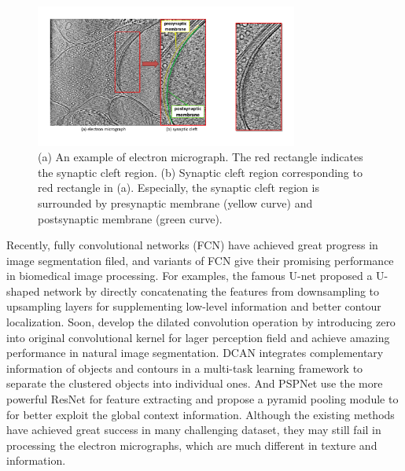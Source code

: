 \begin{figure}[t]
    \begin{center}
        \includegraphics[width=3.4in]{figs/FigImg.pdf}
   \end{center}
\caption{(a) An example of electron micrograph. The red rectangle indicates the synaptic cleft region. 
            (b) Synaptic cleft region corresponding to red rectangle in (a). Especially, the synaptic cleft region is surrounded by presynaptic membrane (yellow curve) and postsynaptic membrane (green curve). }
\label{fig:img}
\end{figure}
Recently, fully convolutional networks (FCN) \cite{Long2015,Ronneberger2015,Chen2016a,Chen2017,Zhao2016} have achieved great progress in image segmentation filed, and variants of FCN \cite{Ronneberger2015,Chen2017,Dhungel2015,Lieman-Sifry2017,Chen2016b,Ourselin} give their promising performance in biomedical image processing.
For examples, the famous U-net \cite{Ronneberger2015} proposed a U-shaped network by directly concatenating the features from downsampling to upsampling layers for supplementing low-level information and better contour localization.
Soon, \cite{Chen2016a} develop the dilated convolution operation by introducing zero into original convolutional kernel for lager perception field and achieve amazing performance in natural image segmentation.
DCAN \cite{Chen2017} integrates complementary information of objects and contours in a multi-task learning framework to separate the clustered objects into individual ones.
And PSPNet \cite{Zhao2016} use the more powerful ResNet \cite{He2016} for feature extracting and propose a pyramid pooling module to for better exploit the global context information.
Although the existing methods have achieved great success in many challenging dataset, they may still fail in processing the electron micrographs, which are much different in texture and information.

